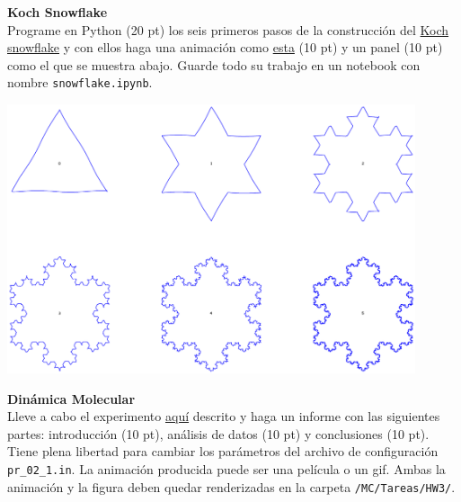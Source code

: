 \documentclass[11pt,letterpaper]{exam}
\begin{document}
\begin{questions}
 
\question[40] \textbf{Koch Snowflake} \\
Programe en Python (20 pt) los seis primeros pasos de la construcción del \href{http://mathworld.wolfram.com/KochSnowflake.html}{Koch snowflake} y con ellos haga una animación como \href{https://github.com/ComputoCienciasUniandes/MetodosComputacionales/blob/master/homework/2015-V/HW3/snowflake.mp4?raw=true}{esta} (10 pt) y un panel (10 pt) como el que se muestra abajo. Guarde todo su trabajo en un notebook con nombre \verb+snowflake.ipynb+.

\vfill
\begin{center}
\includegraphics[width=0.9\textwidth]{kochpanel_tight.pdf}
\end{center}
\vfill
\newpage

\question[30] \textbf{Dinámica Molecular} \\

Lleve a cabo el experimento \href{https://github.com/ComputoCienciasUniandes/MetodosComputacionalesLaboratorio/blob/master/2015-V/actividades/experimentos/Exp1/Exp1.md}{aquí} descrito y haga un informe con las siguientes partes: introducción (10 pt), análisis de datos (10 pt) y conclusiones (10 pt). Tiene plena libertad para cambiar los parámetros del archivo de configuración \verb+pr_02_1.in+. La animación producida puede ser una película o un gif. Ambas la animación y la figura deben quedar renderizadas en la carpeta \verb+/MC/Tareas/HW3/+.


\end{questions}
\end{document}
